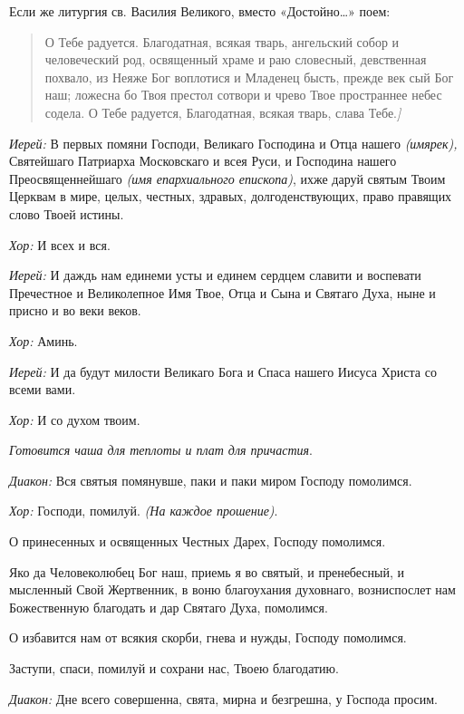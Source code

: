 \begin{mymulticols}
{Если же литургия св. Василия Великого, вместо «Достойно…» поем: }

\begin{quote}
О Тебе радуется. Благодатная, всякая тварь, ангельский собор и человеческий род, освященный храме и раю словесный, девственная похвало, из Неяже Бог воплотися и Младенец бысть, прежде век сый Бог наш; ложесна бо Твоя престол сотвори и чрево Твое пространнее небес содела. О Тебе радуется, Благодатная, всякая тварь, слава Тебе.{\itshape ]}
\end{quote}      

{\itshape Иерей:} В первых помяни Господи, Великаго Господина и Отца нашего  {\itshape  (имярек),} Святейшаго Патриарха Московскаго и всея Руси, и Господина нашего Преосвященнейшаго {\itshape (имя епархиального епископа)}, ихже даруй святым Твоим Церквам в мире, целых, честных, здравых, долгоденствующих, право правящих слово Твоей истины. 

{\itshape Хор:} И всех и вся.

{\itshape Иерей:} И даждь нам единеми усты и единем сердцем славити и воспевати Пречестное и Великолепное Имя Твое, Отца и Сына и Святаго Духа, ныне и присно и во веки веков. 

{\itshape Хор:} Аминь.

{\itshape Иерей:} И да будут милости Великаго Бога и Спаса нашего Иисуса Христа со всеми вами.

{\itshape Хор:} И со духом твоим.

{\itshape Готовится чаша для теплоты и плат для причастия}. 


{\itshape Диакон:} Вся святыя помянувше, паки и паки миром Господу помолимся. 

{\itshape Хор:} Господи, помилуй. {\itshape (На каждое прошение)}. 

О принесенных и освященных Честных Дарех, Господу помолимся. 

Яко да Человеколюбец Бог наш, приемь я во святый, и пренебесный, и мысленный Свой Жертвенник, в воню благоухания духовнаго, возниспослет нам Божественную благодать и дар Святаго Духа, помолимся. 

О избавится нам от всякия скорби, гнева и нужды, Господу помолимся. 

Заступи, спаси, помилуй и сохрани нас, Твоею благодатию. 

{\itshape Диакон:} Дне всего совершенна, свята, мирна и безгрешна, у Господа просим. 


\end{mymulticols}
